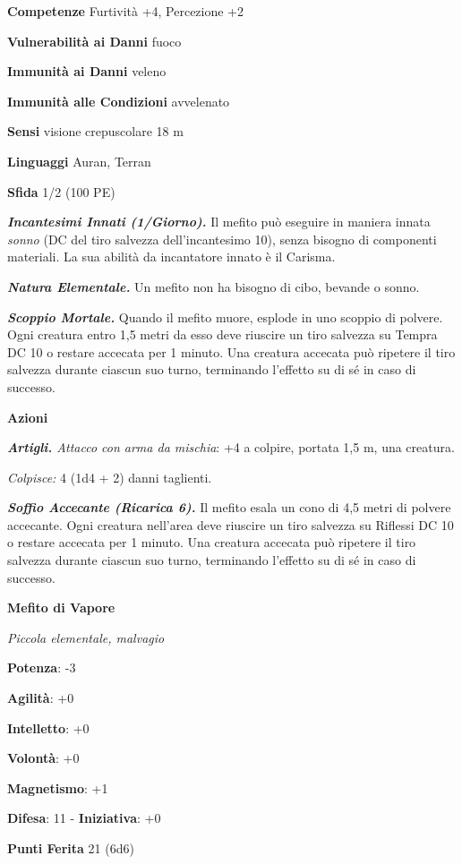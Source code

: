 \begin{multicols}{2}
\textbf{Competenze} Furtività +4, Percezione +2

\textbf{Vulnerabilità ai Danni} fuoco

\textbf{Immunità ai Danni} veleno

\textbf{Immunità alle Condizioni} avvelenato

\textbf{Sensi} visione crepuscolare 18 m

\textbf{Linguaggi} Auran, Terran

\textbf{Sfida} 1/2 (100 PE)

\emph{\textbf{Incantesimi Innati (1/Giorno).}} Il mefito può eseguire in
maniera innata \emph{sonno} (DC del tiro salvezza dell'incantesimo 10),
senza bisogno di componenti materiali. La sua abilità da incantatore
innato è il Carisma.

\emph{\textbf{Natura Elementale.}} Un mefito non ha bisogno di cibo,
bevande o sonno.

\emph{\textbf{Scoppio Mortale.}} Quando il mefito muore, esplode in uno
scoppio di polvere. Ogni creatura entro 1,5 metri da esso deve riuscire
un tiro salvezza su Tempra DC 10 o restare accecata per 1 minuto.
Una creatura accecata può ripetere il tiro salvezza durante ciascun suo
turno, terminando l'effetto su di sé in caso di successo.

\textbf{Azioni}

\emph{\textbf{Artigli.} Attacco con arma da mischia}: +4 a colpire,
portata 1,5 m, una creatura.

\emph{Colpisce:} 4 (1d4 + 2) danni taglienti.

\emph{\textbf{Soffio Accecante (Ricarica 6).}} Il mefito esala un cono
di 4,5 metri di polvere accecante. Ogni creatura nell'area deve riuscire
un tiro salvezza su Riflessi DC 10 o restare accecata per 1 minuto. Una
creatura accecata può ripetere il tiro salvezza durante ciascun suo
turno, terminando l'effetto su di sé in caso di successo.

\textbf{Mefito di Vapore}

\emph{Piccola elementale, malvagio}

\textbf{Potenza}: -3

\textbf{Agilità}: +0

\textbf{Intelletto}: +0

\textbf{Volontà}: +0

\textbf{Magnetismo}: +1

\textbf{Difesa}: 11 - \textbf{Iniziativa}: +0

\textbf{Punti Ferita} 21 (6d6)


\end{multicols}
